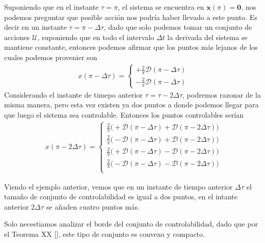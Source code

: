     Suponiendo que en el instante $\tau = \pi$, el sistema se encuentra en $\bm{x}(\pi) = \bm{0}$, nos podemos preguntar que posible acción nos podría haber llevado a este punto. Es decir en un instante $\tau = \pi - \Delta \tau$, dado que solo podemos tomar un conjunto de acciones $\mathcal{U}$, suponiendo que en todo el intervalo $\Delta t$ la derivada del sistema se mantiene constante, entonces podemos afirmar que los puntos más lejanos de los cuales podemos provenier son 
    \begin{gather}
        x(\pi - \Delta \tau) =   
        \begin{cases}
            +\frac{2}{\pi} \bm{\mathcal{D}}(\pi - \Delta \tau)\\[5pt]
            -\frac{2}{\pi} \bm{\mathcal{D}}(\pi - \Delta \tau) 
        \end{cases}
    \end{gather}
    Considerando el instante de timepo anterior $\tau = \tau - 2\Delta \tau$, podremos razonar de la misma manera, pero esta vez existen ya dos puntos a donde podemos llegar para que luego el sistema sea controlable. Entonces los puntos controlables serían 
    \begin{gather*}
        x(\pi - 2\Delta \tau) = 
        \begin{cases}
            \frac{2}{\pi} \Big( 
            +\bm{\mathcal{D}}(\pi - \Delta \tau) + \bm{\mathcal{D}}(\pi - 2\Delta \tau) \Big) \\
            \frac{2}{\pi} \Big( 
            -\bm{\mathcal{D}}(\pi - \Delta \tau) + \bm{\mathcal{D}}(\pi - 2\Delta \tau) \Big) \\
            \frac{2}{\pi} \Big( 
            +\bm{\mathcal{D}}(\pi - \Delta \tau) - \bm{\mathcal{D}}(\pi - 2\Delta \tau) \Big) \\
            \frac{2}{\pi} \Big( 
            -\bm{\mathcal{D}}(\pi - \Delta \tau) - \bm{\mathcal{D}}(\pi - 2\Delta \tau) \Big) \\
        \end{cases}
    \end{gather*}

    Viendo el ejemplo anterior, vemos que en un instante de tiempo anterior $\Delta \tau$ el tamaño de conjunto de controlabilidad es igual a dos puntos, en el intante anterior $2\Delta \tau $ se añaden cuatro puntos más.

    Solo necestiamos analizar el borde del conjunto de controlabilidad, dado que por el Teorema XX [], este tipo de conjunto es convexo y compacto.  